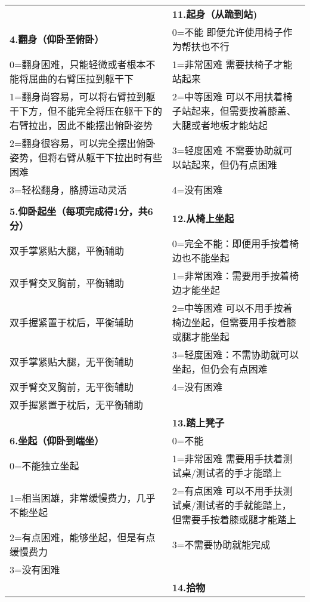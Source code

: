 \begin{table}[h]
\begin{tabular}{|p{}||p{}|}
      & \cellcolor{LightCyan} \textbf{11.起身（从跪到站)}      \\ \cline{1-2}
\cellcolor{LightCyan} \textbf{4.翻身（仰卧至俯卧）}   & 0=不能   即便允许使用椅子作为帮扶也不行     \\ \cline{1-1}
0=翻身困难，只能轻微或者根本不能将屈曲的右臂压拉到躯干下  & 1=非常困难   需要扶椅子才能站起来        \\
1=翻身尚容易，可以将右臂拉到躯干下方，但不能完全将压在躯干下的右臂拉出，因此不能摆出俯卧姿势 & 2=中等困难   可以不用扶着椅子站起来，但需要按着膝盖、大腿或者地板才能站起         \\
2=翻身很容易，可以完全摆出俯卧姿势，但将右臂从躯干下拉出时有些困难              & 3=轻度困难   不需要协助就可以站起来，但仍有点困难\\
3=轻松翻身，胳膊运动灵活              & 4=没有困难\\
      &       \\ \cline{1-2}
\textbf{5.仰卧起坐（每项完成得1分，共6分）}   & \cellcolor{LightCyan} \textbf{12.从椅上坐起}\\ \cline{1-2}
双手掌紧贴大腿，平衡辅助               & 0=完全不能：即便用手按着椅边也不能坐起     \\
双手臂交叉胸前，平衡辅助               & 1=非常困难：需要用手按着椅边才能坐起      \\
双手握紧置于枕后，平衡辅助              & 2=中等困难   可以不用手按着椅边坐起，但需要用手按着膝或腿才能坐起             \\
双手掌紧贴大腿，无平衡辅助              & 3=轻度困难：不需协助就可以坐起，但仍会有点困难 \\
双手臂交叉胸前，无平衡辅助              & 4=没有困难\\
双手握紧置于枕后，无平衡辅助             &       \\ \cline{2-2}
      & \textbf{13.踏上凳子}          \\ \cline{1-2}
\cellcolor{LightCyan} \textbf{6.坐起（仰卧到端坐）}   & 0=不能  \\ \cline{1-1}
0=不能独立坐起  & 1=非常困难   需要用手扶着测试桌/测试者的手才能踏上   \\
1=相当困雄，非常缓慢费力，几乎不能坐起       & 2=有点困难   可以不用手扶测试桌/测试者的手就能踏上，但需要手按着膝或腿才能踏上      \\
2=有点困难，能够坐起，但是有点缓慢费力       & 3=不需要协助就能完成                \\
3=没有困难&       \\ \cline{2-2}
      & \cellcolor{LightCyan} \textbf{14.拾物}            \\ \cline{1-2}

\end{tabular}
\end{table}
